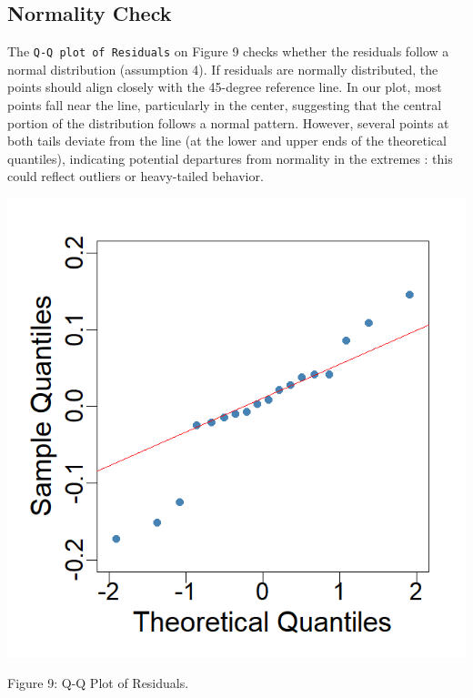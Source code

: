 \documentclass[
  12pt,
]{article}
\begin{document}
\subsection{Normality Check}\label{normality-check}

\noindent

\begin{minipage}{0.65\textwidth}
\justifying
The \texttt{Q-Q plot of Residuals} on Figure 9 checks whether the residuals follow a normal distribution (assumption 4). If residuals are normally distributed, the points should align closely with the 45-degree reference line. 
In our plot, most points fall near the line, particularly in the center, suggesting that the central portion of the distribution follows a normal pattern. However, several points at both tails deviate from the line (at the lower and upper ends of the theoretical quantiles), indicating potential departures from normality in the extremes : this could reflect outliers or heavy-tailed behavior.
\end{minipage}
\hfill
\begin{minipage}{0.33\textwidth}
\centering
\vspace{-2em}  %
\includegraphics[width=0.9\linewidth]{figures/qqplot_residuals.png}
\vspace{-1em}
\parbox{\linewidth}{\fontsize{12}{14}\selectfont Figure 9: Q-Q Plot of Residuals.}
\end{minipage}
\vspace{0.5em}
\end{document}
